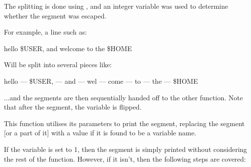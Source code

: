 \documentclass[12pt, a4paper]{report}
\begin{document}
                The splitting is done using , and an integer variable
                 was used to determine whether the segment was escaped.

                For example, a line such as:

                \begin{center}
                    hello \$USER, and wel\quot come to the \$HOME\quot
                \end{center}
                
                Will be split into several pieces like:

                \begin{center}
                    hello --- \$USER, --- and --- wel --- come --- to --- the --- \$HOME
                \end{center}

                ...and the segments are then sequentially handed off to the other function.
                Note that after the  segment, the  variable is flipped.

                \clearpage
            
                This function utilises its parameters to print the segment,
                replacing the segment [or a part of it] with a value if it
                is found to be a variable name.

                If the  variable is set to 1, then the segment is
                simply printed without considering the rest of the function.
                However, if it isn't, then the following steps are covered:
\end{document}
